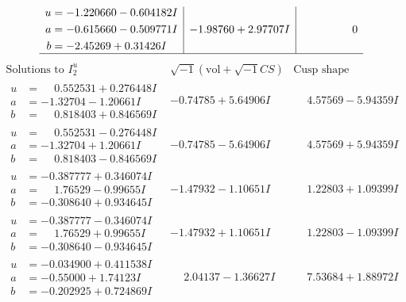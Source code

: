 \documentclass[1p]{elsarticle_modified}
\theoremstyle{definition}
\newcommand{\I}{\sqrt{-1}}
\begin{document}
$$\begin{array}{c|c|c}
\begin{aligned}
u &= -1.220660 - 0.604182 I \\
a &= -0.615660 - 0.509771 I \\
b &= -2.45269 + 0.31426 I\end{aligned}
 & -1.98760 + 2.97707 I & \phantom{-0.000000 } 0\\
 \hline 
 \end{array}$$\newpage$$\begin{array}{c|c|c}  
\text{Solutions to }I^u_{2}& \I (\text{vol} + \sqrt{-1}CS) & \text{Cusp shape}\\
 \hline 
\begin{aligned}
u &= \phantom{-}0.552531 + 0.276448 I \\
a &= -1.32704 - 1.20661 I \\
b &= \phantom{-}0.818403 + 0.846569 I\end{aligned}
 & -0.74785 + 5.64906 I & \phantom{-}4.57569 - 5.94359 I \\ \hline\begin{aligned}
u &= \phantom{-}0.552531 - 0.276448 I \\
a &= -1.32704 + 1.20661 I \\
b &= \phantom{-}0.818403 - 0.846569 I\end{aligned}
 & -0.74785 - 5.64906 I & \phantom{-}4.57569 + 5.94359 I \\ \hline\begin{aligned}
u &= -0.387777 + 0.346074 I \\
a &= \phantom{-}1.76529 - 0.99655 I \\
b &= -0.308640 + 0.934645 I\end{aligned}
 & -1.47932 - 1.10651 I & \phantom{-}1.22803 + 1.09399 I \\ \hline\begin{aligned}
u &= -0.387777 - 0.346074 I \\
a &= \phantom{-}1.76529 + 0.99655 I \\
b &= -0.308640 - 0.934645 I\end{aligned}
 & -1.47932 + 1.10651 I & \phantom{-}1.22803 - 1.09399 I \\ \hline\begin{aligned}
u &= -0.034900 + 0.411538 I \\
a &= -0.55000 + 1.74123 I \\
b &= -0.202925 + 0.724869 I\end{aligned}
 & \phantom{-}2.04137 - 1.36627 I & \phantom{-}7.53684 + 1.88972 I \\ \hline\begin{aligned}

\end{aligned}
\end{array}$$
\end{document}
